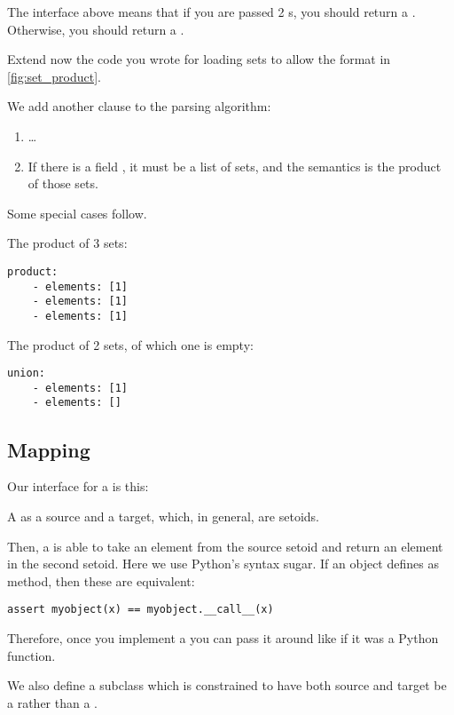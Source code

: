 The interface above means that if you are passed 2 \FiniteSet{}s, you should return a \FiniteSet.
Otherwise, you should return a \Setoid.


Extend now the code you wrote for loading sets to allow the format in \cref{fig:set_product}.

We add another clause to the parsing algorithm:
\begin{enumerate}
\item \dots
\item If there is a field , it must be a list of sets, and the semantics is the product of those sets.
\end{enumerate}

Some special cases follow.

The product of 3 sets:

\begin{verbatim}
product:
    - elements: [1]
    - elements: [1]
    - elements: [1]
\end{verbatim}

The product of 2 sets, of which one is empty:

\begin{verbatim}
union:
    - elements: [1]
    - elements: []
\end{verbatim}


\subsection{Mapping}

Our interface for a  is this:


A  as a source and a target, which, in general, are setoids.

Then, a  is able to take an element from the source setoid and return an element in the second setoid.
Here we use Python's syntax sugar. If an object defines as  method, then these are equivalent:

\begin{verbatim}
assert myobject(x) == myobject.__call__(x)
\end{verbatim}

Therefore, once you implement a  you can pass it around like if it was a Python function.

We also define a subclass  which is constrained to have both source and target be a \FiniteSet rather than a \Setoid.

